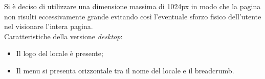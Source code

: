 Si è deciso di utilizzare una dimensione massima di 1024px in modo che la pagina non risulti eccessivamente grande evitando così l'eventuale sforzo fisico dell'utente nel visionare l'intera pagina.\\
Caratteristiche della versione \emph{desktop}:
\begin{itemize}
	\item Il logo del locale è presente;
	\item Il menu si presenta orizzontale tra il nome del locale e il breadcrumb.
\end{itemize}